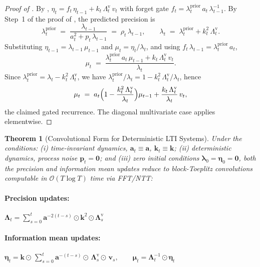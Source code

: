 \documentclass{article}
\newtheorem{theorem}{Theorem}
\begin{document}
\begin{mdframed}
\begin{proof}[Proof of ]
By , $\eta_t = f_t\,\eta_{t-1} + k_t\,\Lambda_t^{\mathrm{v}}\,v_t$ with forget gate
$f_t = \lambda_t^{\mathrm{prior}}\,a_t\,\lambda_{t-1}^{-1}$. By Step~1 of the proof of , the
predicted precision is
\[
\lambda_t^{\mathrm{prior}} \;=\; \frac{\lambda_{t-1}}{a_t^2 + p_t\,\lambda_{t-1}} \;=\; \rho_t\,\lambda_{t-1},
\qquad
\lambda_t \;=\; \lambda_t^{\mathrm{prior}} + k_t^2\,\Lambda_t^{\mathrm{v}}.
\]
Substituting $\eta_{t-1} = \lambda_{t-1}\,\mu_{t-1}$ and $\mu_t = \eta_t/\lambda_t$, and using
$f_t\,\lambda_{t-1} = \lambda_t^{\mathrm{prior}}\,a_t$,
\[
\mu_t \;=\; \frac{\lambda_t^{\mathrm{prior}}\,a_t\,\mu_{t-1} + k_t\,\Lambda_t^{\mathrm{v}}\,v_t}{\lambda_t}.
\]
Since $\lambda_t^{\mathrm{prior}} = \lambda_t - k_t^2\,\Lambda_t^{\mathrm{v}}$, we have
$\lambda_t^{\mathrm{prior}}/\lambda_t = 1 - k_t^2\,\Lambda_t^{\mathrm{v}}/\lambda_t$, hence
\[
\mu_t \;=\; a_t\Bigl(1 - \frac{k_t^2\,\Lambda_t^{\mathrm{v}}}{\lambda_t}\Bigr)\mu_{t-1} + \frac{k_t\,\Lambda_t^{\mathrm{v}}}{\lambda_t}\,v_t,
\]
the claimed gated recurrence. The diagonal multivariate case applies elementwise.
\end{proof}
\end{mdframed}

\begin{theorem}[Convolutional Form for Deterministic LTI Systems]
\label{thm:conv-form}
Under the conditions: (i) time-invariant dynamics, $\mathbf{a}_t \equiv \mathbf{a}$, $\mathbf{k}_t \equiv \mathbf{k}$; (ii) deterministic dynamics, process noise $\mathbf{p}_t = \mathbf{0}$; and (iii) zero initial conditions $\boldsymbol{\lambda}_0 = \boldsymbol{\eta}_0 = \mathbf{0}$, both the precision and information mean updates reduce to block-Toeplitz
convolutions computable in $\mathcal{O}(T \log T)$ time via FFT/NTT:

\paragraph{Precision updates:} $ \boldsymbol{\Lambda}_t = \sum_{s=0}^t \mathbf{a}^{-2(t-s)} \odot \mathbf{k}^2 \odot \boldsymbol{\Lambda}^{\mathrm{v}}_s $

\paragraph{Information mean updates:} $\boldsymbol{\eta}_t = \mathbf{k} \odot\,\sum_{s=0}^{t} \mathbf{a}^{-(t-s)} \odot\,\boldsymbol{\Lambda}_s^{\mathrm{v}} \odot\,\mathbf{v}_s,
\qquad
\boldsymbol{\mu}_t = \boldsymbol{\Lambda}_t^{-1} \odot \boldsymbol{\eta}_t $
\end{theorem}
\end{document}
